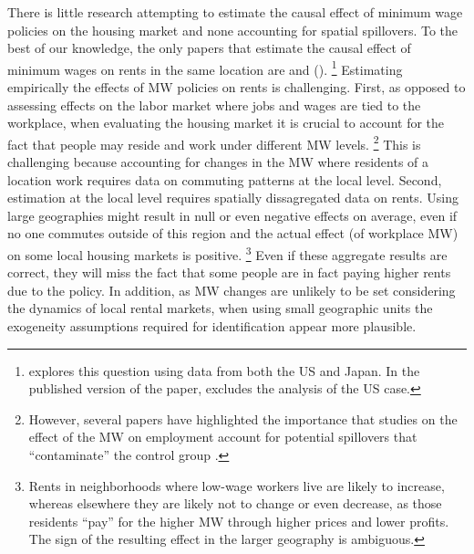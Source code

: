 
There is little research attempting to estimate the causal effect of minimum wage 
policies on the housing market and none accounting for spatial spillovers.
To the best of our knowledge, the only papers that estimate the causal effect of 
minimum wages on rents in the same location are \textcite{Tidemann2018} and 
\citeauthor{Yamagishi2019} (\citeyear{Yamagishi2019, Yamagishi2021}).%
\footnote{\textcite{Yamagishi2019} explores this question using data from both 
the US and Japan. In the published version of the paper, 
\textcite{Yamagishi2021} excludes the analysis of the US case.}
Estimating empirically the effects of MW policies on rents is challenging. 
First, as opposed to assessing effects on the labor market where jobs and wages 
are tied to the workplace, when evaluating the housing market it is crucial to 
account for the fact that people may reside and work under different MW levels.%
\footnote{However, several papers have highlighted the importance that studies
on the effect of the MW on employment account for potential spillovers that
``contaminate'' the control group \parencite{Kuehn2016, Huang2020}.} 
This is challenging because accounting for changes in the MW where residents
of a location work requires data on commuting patterns at the local level.
Second, estimation at the local level requires spatially dissagregated data on 
rents.
Using large geographies might result in null or even negative effects on average,
even if no one commutes outside of this region and the actual effect (of workplace
MW) on some local housing markets is positive.%
\footnote{Rents in neighborhoods where low-wage workers live are likely to 
increase, whereas elsewhere they are likely not to change or even decrease, as 
those residents ``pay'' for the higher MW through higher prices and lower profits.
The sign of the resulting effect in the larger geography is ambiguous.}
Even if these aggregate results are correct, they will miss the fact that some
people are in fact paying higher rents due to the policy.
In addition, as MW changes are unlikely to be set considering the dynamics of 
local rental markets, when using small geographic units the exogeneity assumptions 
required for identification appear more plausible.



